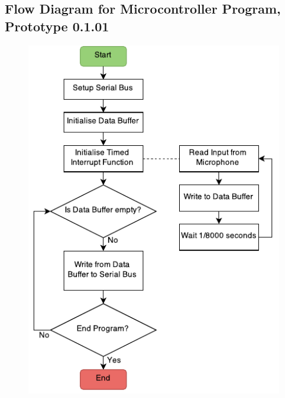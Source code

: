 \subsection{Flow Diagram for Microcontroller Program, Prototype 0.1.01}
\label{mcflow}
\begin{figure}[H]
\centering
\includegraphics[scale = 1]{Images/mc0101}
\end{figure}


\newpage
